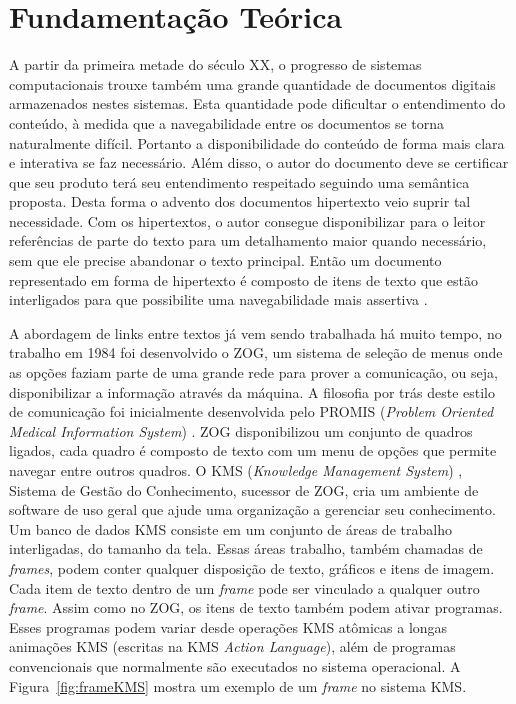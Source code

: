 \chapter{Fundamentação Teórica} \label{cap:cap2}

A partir da primeira metade do século XX, o progresso de sistemas computacionais trouxe também uma grande quantidade de documentos digitais armazenados nestes sistemas. Esta quantidade pode dificultar o entendimento do conteúdo, à medida que a navegabilidade entre os documentos se torna naturalmente difícil. Portanto a disponibilidade do conteúdo de forma mais clara e interativa se faz necessário. Além disso, o autor do documento deve se certificar que seu produto terá seu entendimento respeitado seguindo uma semântica proposta. Desta forma o advento dos documentos hipertexto veio suprir tal necessidade. Com os hipertextos, o autor consegue disponibilizar para o leitor referências de parte do texto para um detalhamento maior quando necessário, sem que ele precise abandonar o texto principal. Então um documento representado em forma de hipertexto é composto de itens de texto que estão interligados para que possibilite uma navegabilidade mais assertiva \cite{Halasz:1994:DHR:175235.175237}.

A abordagem de links entre textos já vem sendo trabalhada há muito tempo, no trabalho \cite {mccracken1984experience} em 1984 foi desenvolvido o ZOG, um sistema de seleção de menus onde as opções faziam parte de uma grande rede para prover a comunicação, ou seja, disponibilizar a informação através da máquina. A filosofia por trás deste estilo de comunicação foi inicialmente desenvolvida pelo PROMIS (\textit{Problem Oriented Medical Information System}) \cite{gilroy1977integration}. ZOG disponibilizou um conjunto de quadros ligados, cada quadro é composto de texto com um menu de opções que permite navegar entre outros quadros. O KMS (\textit{Knowledge Management System}) \cite{akscyn1987kms}, Sistema de Gestão do Conhecimento, sucessor de ZOG, cria um ambiente de software de uso geral que ajude uma organização a gerenciar seu conhecimento. Um banco de dados KMS consiste em um conjunto de áreas de trabalho interligadas, do tamanho da tela. Essas áreas trabalho, também chamadas de \textit{frames}, podem conter qualquer disposição de texto, gráficos e itens de imagem. Cada item de texto dentro de um \textit{frame} pode ser vinculado a qualquer outro \textit{frame}. Assim como no ZOG, os itens de texto também podem ativar programas. Esses programas podem variar desde operações KMS atômicas a longas animações KMS (escritas na KMS \textit{Action Language}), além de programas convencionais que normalmente são executados no sistema operacional. A Figura~\ref{fig:frameKMS} mostra um exemplo de um \textit{frame} no sistema KMS.


